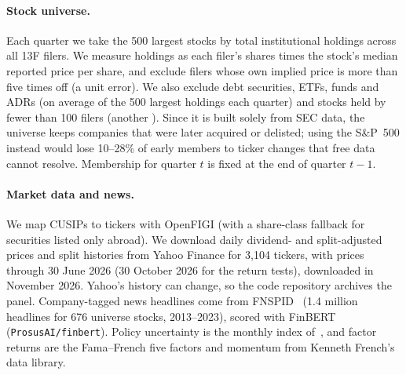 \paragraph{Stock universe.} Each quarter we take the 500 largest stocks by
total institutional holdings across all 13F filers. We measure holdings as
each filer's shares times the stock's median reported price per share, and
exclude filers whose own implied price is more than five times off (a unit
error). We also exclude debt securities, ETFs, funds and ADRs (on average
\univtype{} of the 500 largest holdings each quarter) and stocks held by
fewer than 100 filers (another \univholders). Since it is built solely from SEC
data, the universe keeps companies that were later acquired or
delisted; using the S\&P~500 instead would lose 10--28\% of early members to
ticker changes that free data cannot resolve. Membership for quarter $t$ is
fixed at the end of quarter $t-1$.

\paragraph{Market data and news.} We map CUSIPs to tickers with OpenFIGI
(with a share-class fallback for securities listed only abroad). We download
daily dividend- and split-adjusted prices and split histories from Yahoo
Finance for 3,104 tickers, with prices through 30 June 2026 (30 October 2026
for the return tests), downloaded in November 2026. Yahoo's history can
change, so the code repository archives the panel. Company-tagged news
headlines come from FNSPID~\cite{dong2024fnspid} (1.4 million headlines for
676 universe stocks, 2013--2023), scored with FinBERT~\cite{araci2019finbert}
(\texttt{ProsusAI/finbert}). Policy uncertainty is the monthly index
of~\cite{baker2016epu}, and factor returns are the Fama--French five factors
and momentum from Kenneth French's data library.
